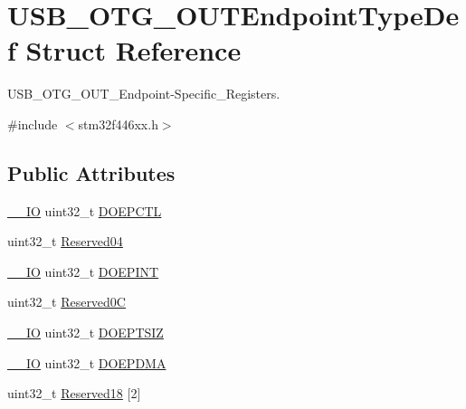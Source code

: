 \hypertarget{struct_u_s_b___o_t_g___o_u_t_endpoint_type_def}{}\section{U\+S\+B\+\_\+\+O\+T\+G\+\_\+\+O\+U\+T\+Endpoint\+Type\+Def Struct Reference}
\label{struct_u_s_b___o_t_g___o_u_t_endpoint_type_def}


U\+S\+B\+\_\+\+O\+T\+G\+\_\+\+O\+U\+T\+\_\+\+Endpoint-\/\+Specific\+\_\+\+Registers.  




{\ttfamily \#include $<$stm32f446xx.\+h$>$}

\subsection*{Public Attributes}
\begin{DoxyCompactItemize}
\item 
\hyperlink{core__sc300_8h_aec43007d9998a0a0e01faede4133d6be}{\+\_\+\+\_\+\+IO} uint32\+\_\+t \hyperlink{struct_u_s_b___o_t_g___o_u_t_endpoint_type_def_a86a62895d4b90531c30f5a48f404ddea}{D\+O\+E\+P\+C\+TL}
\item 
uint32\+\_\+t \hyperlink{struct_u_s_b___o_t_g___o_u_t_endpoint_type_def_a76533e00218c269a8064cf68c3daf7e9}{Reserved04}
\item 
\hyperlink{core__sc300_8h_aec43007d9998a0a0e01faede4133d6be}{\+\_\+\+\_\+\+IO} uint32\+\_\+t \hyperlink{struct_u_s_b___o_t_g___o_u_t_endpoint_type_def_a0b8b826828cba51585aabe9b73074d07}{D\+O\+E\+P\+I\+NT}
\item 
uint32\+\_\+t \hyperlink{struct_u_s_b___o_t_g___o_u_t_endpoint_type_def_a1d7bc9b546c4dd8ce2fe792945cf7a9d}{Reserved0C}
\item 
\hyperlink{core__sc300_8h_aec43007d9998a0a0e01faede4133d6be}{\+\_\+\+\_\+\+IO} uint32\+\_\+t \hyperlink{struct_u_s_b___o_t_g___o_u_t_endpoint_type_def_a5e4876bb58a4a01eacf675b69f36df26}{D\+O\+E\+P\+T\+S\+IZ}
\item 
\hyperlink{core__sc300_8h_aec43007d9998a0a0e01faede4133d6be}{\+\_\+\+\_\+\+IO} uint32\+\_\+t \hyperlink{struct_u_s_b___o_t_g___o_u_t_endpoint_type_def_a189d59fa4e34c96ce7eb25c0afd50cd7}{D\+O\+E\+P\+D\+MA}
\item 
uint32\+\_\+t \hyperlink{struct_u_s_b___o_t_g___o_u_t_endpoint_type_def_a51b162457add1bb7cc254b7aeb9f94bd}{Reserved18} \mbox{[}2\mbox{]}
\end{DoxyCompactItemize}



